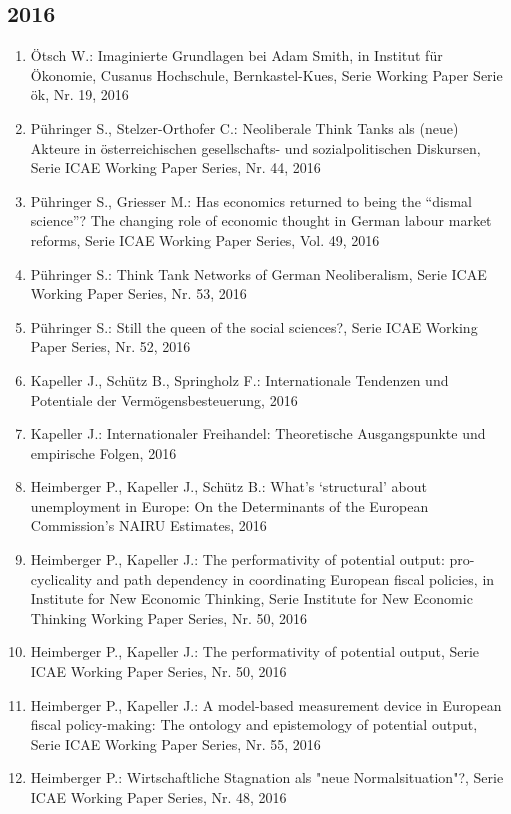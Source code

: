 \subsection*{2016}
\begin{enumerate}
    	 \item Ötsch W.: Imaginierte Grundlagen bei Adam Smith, in Institut für Ökonomie, Cusanus Hochschule, Bernkastel-Kues, Serie Working Paper Serie ök, Nr. 19, 2016
	 \item Pühringer S., Stelzer-Orthofer C.: Neoliberale Think Tanks als (neue) Akteure in österreichischen gesellschafts- und sozialpolitischen Diskursen, Serie ICAE Working Paper Series, Nr. 44, 2016
	 \item Pühringer S., Griesser M.: Has economics returned to being the “dismal science”? The changing role of economic thought in German labour market reforms, Serie ICAE Working Paper Series, Vol. 49, 2016
	 \item Pühringer S.: Think Tank Networks of German Neoliberalism, Serie ICAE Working Paper Series, Nr. 53, 2016
	 \item Pühringer S.: Still the queen of the social sciences?, Serie ICAE Working Paper Series, Nr. 52, 2016
	 \item Kapeller J., Schütz B., Springholz F.: Internationale Tendenzen und Potentiale der Vermögensbesteuerung, 2016
	 \item Kapeller J.: Internationaler Freihandel: Theoretische Ausgangspunkte und empirische Folgen, 2016
	 \item Heimberger P., Kapeller J., Schütz B.: What’s ‘structural’ about unemployment in Europe: On the Determinants of the European Commission’s NAIRU Estimates, 2016
	 \item Heimberger P., Kapeller J.: The performativity of potential output: pro-cyclicality and path dependency in coordinating European fiscal policies, in Institute for New Economic Thinking, Serie Institute for New Economic Thinking  Working Paper Series, Nr. 50, 2016
	 \item Heimberger P., Kapeller J.: The performativity of potential output, Serie ICAE Working Paper Series, Nr. 50, 2016
	 \item Heimberger P., Kapeller J.: A model-based measurement device in European fiscal policy-making: The ontology and epistemology of potential output, Serie ICAE Working Paper Series, Nr. 55, 2016
	 \item Heimberger P.: Wirtschaftliche Stagnation als "neue Normalsituation"?, Serie ICAE Working Paper Series, Nr. 48, 2016

\end{enumerate}
